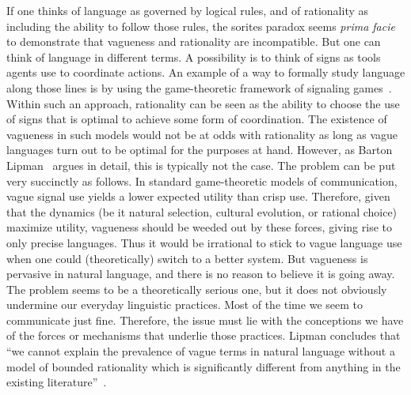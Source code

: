 \documentclass[a4paper]{article}
\begin{document}
If one thinks of language as governed by logical rules, and of rationality as including the ability to follow those rules, the sorites paradox seems \emph{prima facie} to demonstrate that vagueness and rationality are incompatible.
But one can think of language in different terms.
A possibility is to think of signs as tools agents use to coordinate actions.
An example of a way to formally study language along those lines is by using the game-theoretic framework of signaling games~\parencite{lewis_convention_1969}.
Within such an approach, rationality can be seen as the ability to choose the use of signs that is optimal to achieve some form of coordination.
The existence of vagueness in such models would not be at odds with rationality as long as vague languages turn out to be optimal for the purposes at hand.
However, as Barton Lipman~\parencite*{lipman_why_2009} argues in detail, this is typically not the case.
The problem can be put very succinctly as follows.
In standard game-theoretic models of communication, vague signal use yields a lower expected utility than crisp use.
Therefore, given that the dynamics (be it natural selection, cultural evolution, or rational choice) maximize utility, vagueness should be weeded out by these forces, giving rise to only precise languages.
Thus it would be irrational to stick to vague language use when one could (theoretically) switch to a better system.
But vagueness is pervasive in natural language, and there is no reason to believe it is going away.
The problem seems to be a theoretically serious one, but it does not obviously undermine our everyday linguistic practices.
Most of the time we seem to communicate just fine.
Therefore, the issue must lie with the conceptions we have of the forces or mechanisms that underlie those practices.
Lipman concludes that ``we cannot explain the prevalence of vague terms in natural language without a model of bounded rationality which is significantly different from anything in the existing literature''~\parencite*[1]{lipman_why_2009}.
\end{document}
